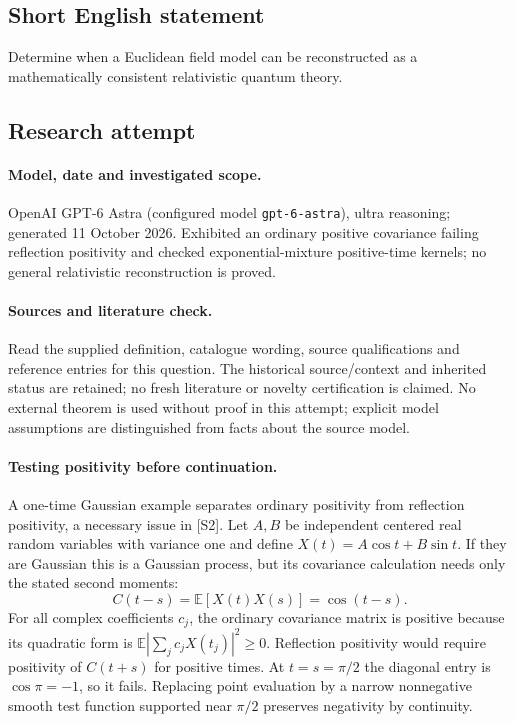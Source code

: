 \documentclass[11pt]{article}
\begin{document}
\subsection{Short English statement}
Determine when a Euclidean field model can be reconstructed as a mathematically consistent relativistic quantum theory.
\subsection{Research attempt}
\paragraph{Model, date and investigated scope.}
OpenAI GPT-6 Astra (configured model \texttt{gpt-6-astra}), ultra reasoning; generated 11 October 2026. Exhibited an ordinary positive covariance failing reflection positivity and checked exponential-mixture positive-time kernels; no general relativistic reconstruction is proved.

\paragraph{Sources and literature check.}
Read the supplied definition, catalogue wording, source qualifications and reference entries for this question. The historical source/context and inherited status are retained; no fresh literature or novelty certification is claimed. No external theorem is used without proof in this attempt; explicit model assumptions are distinguished from facts about the source model.

\paragraph{Testing positivity before continuation.} A one-time Gaussian example separates ordinary positivity from reflection positivity, a necessary issue in [S2]. Let \(A,B\) be independent centered real random variables with variance one and define \(X(t)=A\cos t+B\sin t\). If they are Gaussian this is a Gaussian process, but its covariance calculation needs only the stated second moments:
\[
 C(t-s)=\mathbb E[X(t)X(s)]=\cos(t-s).
\]
For all complex coefficients \(c_j\), the ordinary covariance matrix is positive because its quadratic form is \(\mathbb E|\sum_jc_jX(t_j)|^2\ge0\). Reflection positivity would require positivity of \(C(t+s)\) for positive times. At \(t=s=\pi/2\) the diagonal entry is \(\cos\pi=-1\), so it fails. Replacing point evaluation by a narrow nonnegative smooth test function supported near \(\pi/2\) preserves negativity by continuity.
\end{document}
